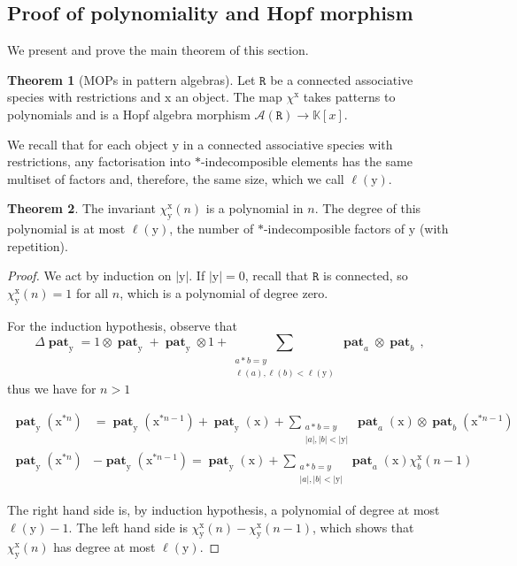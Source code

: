 \documentclass[12pt, reqno]{amsart}
\theoremstyle{definition}
\newtheorem{thm}{Theorem}[section]
\DeclareMathOperator{\pat}{\mathbf{pat}}
\newcommand{\xx}{\mathrm{x}}
\newcommand{\yy}{\mathrm{y}}
\begin{document}
\subsection{Proof of polynomiality and Hopf morphism}

We present and prove the main theorem of this section.

\begin{thm}[MOPs in pattern algebras]\label{thm:polynomiality}
Let $\mathtt{R}$ be a connected associative species with restrictions and $\mathrm{x}$ an object.
The map $\chi^{\mathrm{x}}$ takes patterns to polynomials and is a Hopf algebra morphism $\mathcal A(\mathtt{R}) \to \mathbb{K}[x]$.
\end{thm}

We recall that for each object $\yy$ in a connected associative species with restrictions, any factorisation into $\ast$-indecomposible elements has the same multiset of factors and, therefore, the same size, which we call $\ell(\yy)$.

\begin{thm}\label{lm:polynomial}
The invariant $\chi^{\xx}_{\yy}(n)$ is a polynomial in $n$.
The degree of this polynomial is at most $\ell(\yy)$, the number of $\ast$-indecomposible factors of $\yy$ (with repetition).
\end{thm}


\begin{proof}
We act by induction on $|\yy|$.
If $|\yy| = 0$, recall that $\mathtt{R}$ is connected, so $\chi^{\xx}_{\yy}(n) = 1$ for all $n$, which is a polynomial of degree zero.

For the induction hypothesis, observe that 
$$\Delta \pat_{\yy} = 1\otimes \pat_{\yy} + \pat_{\yy} \otimes 1 + \sum_{\substack{a \ast b = y\\\ell(a), \ell(b) < \ell(\yy)}} \pat_a \otimes \pat_b \, ,$$
thus we have for $n > 1$ 

\begin{equation*}
    \begin{split}
        \pat_{\yy}(\xx^{\ast n}) &= \pat_{\yy}(\xx^{\ast n-1}) + \pat_{\yy}(\xx) + \sum_{\substack{a \ast b = y\\|a|, |b| < |\yy|}} \pat_a (\xx) \otimes \pat_b (\xx^{\ast n-1}) \\
         \pat_{\yy}(\xx^{\ast n}) &- \pat_{\yy}(\xx^{\ast n-1}) = \pat_{\yy}(\xx) + \sum_{\substack{a \ast b = y\\|a|, |b| < |\yy|}} \pat_a (\xx) \chi^{\xx}_b ( n-1)
    \end{split}
\end{equation*}

The right hand side is, by induction hypothesis, a polynomial of degree at most $\ell(\yy) -1$.
The left hand side is $\chi^{\xx}_{\yy}(n) - \chi^{\xx}_{\yy}(n-1)$, which shows that $\chi^{\xx}_{\yy}(n)$ has degree at most $\ell(\yy)$.
\end{proof}
\end{document}
